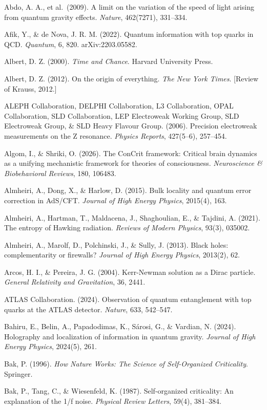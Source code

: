 \documentclass[
]{article}
\begin{document}
Abdo, A. A., et al.~(2009). A limit on the variation of the speed of
light arising from quantum gravity effects. \emph{Nature}, 462(7271),
331--334.

Afik, Y., \& de Nova, J. R. M. (2022). Quantum information with top
quarks in QCD. \emph{Quantum}, 6, 820. arXiv:2203.05582.

Albert, D. Z. (2000). \emph{Time and Chance}. Harvard University Press.

Albert, D. Z. (2012). On the origin of everything. \emph{The New York
Times}. {[}Review of Krauss, 2012.{]}

ALEPH Collaboration, DELPHI Collaboration, L3 Collaboration, OPAL
Collaboration, SLD Collaboration, LEP Electroweak Working Group, SLD
Electroweak Group, \& SLD Heavy Flavour Group. (2006). Precision
electroweak measurements on the Z resonance. \emph{Physics Reports},
427(5--6), 257--454.

Algom, I., \& Shriki, O. (2026). The ConCrit framework: Critical brain
dynamics as a unifying mechanistic framework for theories of
consciousness. \emph{Neuroscience \& Biobehavioral Reviews}, 180,
106483.

Almheiri, A., Dong, X., \& Harlow, D. (2015). Bulk locality and quantum
error correction in AdS/CFT. \emph{Journal of High Energy Physics},
2015(4), 163.

Almheiri, A., Hartman, T., Maldacena, J., Shaghoulian, E., \& Tajdini,
A. (2021). The entropy of Hawking radiation. \emph{Reviews of Modern
Physics}, 93(3), 035002.

Almheiri, A., Marolf, D., Polchinski, J., \& Sully, J. (2013). Black
holes: complementarity or firewalls? \emph{Journal of High Energy
Physics}, 2013(2), 62.

Arcos, H. I., \& Pereira, J. G. (2004). Kerr-Newman solution as a Dirac
particle. \emph{General Relativity and Gravitation}, 36, 2441.

ATLAS Collaboration. (2024). Observation of quantum entanglement with
top quarks at the ATLAS detector. \emph{Nature}, 633, 542--547.

Bahiru, E., Belin, A., Papadodimas, K., Sárosi, G., \& Vardian, N.
(2024). Holography and localization of information in quantum gravity.
\emph{Journal of High Energy Physics}, 2024(5), 261.

Bak, P. (1996). \emph{How Nature Works: The Science of Self-Organized
Criticality}. Springer.

Bak, P., Tang, C., \& Wiesenfeld, K. (1987). Self-organized criticality:
An explanation of the 1/f noise. \emph{Physical Review Letters}, 59(4),
381--384.
\end{document}
